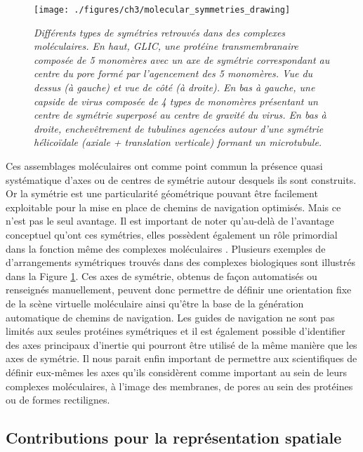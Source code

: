 \begin{figure}[h]
  \centering
  {\texttt{[image: ./figures/ch3/molecular\_symmetries\_drawing]}}
    \caption{{\it Différents types de symétries retrouvés dans des complexes moléculaires. En haut, GLIC, une protéine transmembranaire composée de 5 monomères avec un axe de symétrie correspondant au centre du pore formé par l'agencement des 5 monomères. Vue du dessus (à gauche) et vue de côté (à droite). En bas à gauche, une capside de virus composée de 4 types de monomères présentant un centre de symétrie superposé au centre de gravité du virus. En bas à droite, enchevêtrement de tubulines agencées autour d'une symétrie hélicoïdale (axiale + translation verticale) formant un microtubule.}}
  \label{Fig:molecular_symmetries_drawing}
  \hspace{0.2cm}
\end{figure}

Ces assemblages moléculaires ont comme point commun la présence quasi systématique d'axes ou de centres de symétrie autour desquels ils sont construits. Or la symétrie est une particularité géométrique pouvant être facilement exploitable pour la mise en place de chemins de navigation optimisés. Mais ce n'est pas le seul avantage. Il est important de noter qu'au-delà de l'avantage conceptuel qu'ont ces symétries, elles possèdent également un rôle primordial dans la fonction même des complexes moléculaires \cite{goodsell_structural_2000}. Plusieurs exemples de d'arrangements symétriques trouvés dans des complexes biologiques sont illustrés dans la Figure \ref{Fig:molecular_symmetries_drawing}.
Ces axes de symétrie, obtenus de façon automatisés ou renseignés manuellement, peuvent donc permettre de définir une orientation fixe de la scène virtuelle moléculaire ainsi qu'être la base de la génération automatique de chemins de navigation. Les guides de navigation ne sont pas limités aux seules protéines symétriques et il est également possible d'identifier des axes principaux d'inertie qui pourront être utilisé de la même manière que les axes de symétrie. Il nous parait enfin important de permettre aux scientifiques de définir eux-mêmes les axes qu'ils considèrent comme important au sein de leurs complexes moléculaires, à l'image des membranes, de pores au sein des protéines ou de formes rectilignes.

\subsection{Contributions pour la représentation spatiale}

